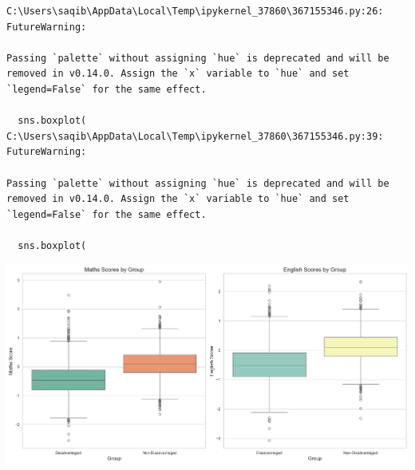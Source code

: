 \documentclass[
  letterpaper,
  DIV=11,
  numbers=noendperiod]{scrartcl}
\begin{document}
\begin{verbatim}
C:\Users\saqib\AppData\Local\Temp\ipykernel_37860\367155346.py:26: FutureWarning: 

Passing `palette` without assigning `hue` is deprecated and will be removed in v0.14.0. Assign the `x` variable to `hue` and set `legend=False` for the same effect.

  sns.boxplot(
C:\Users\saqib\AppData\Local\Temp\ipykernel_37860\367155346.py:39: FutureWarning: 

Passing `palette` without assigning `hue` is deprecated and will be removed in v0.14.0. Assign the `x` variable to `hue` and set `legend=False` for the same effect.

  sns.boxplot(
\end{verbatim}

\includegraphics{P4DS_A2_Data_Analysis_Project_files/figure-pdf/cell-65-output-2.png}
\end{document}

